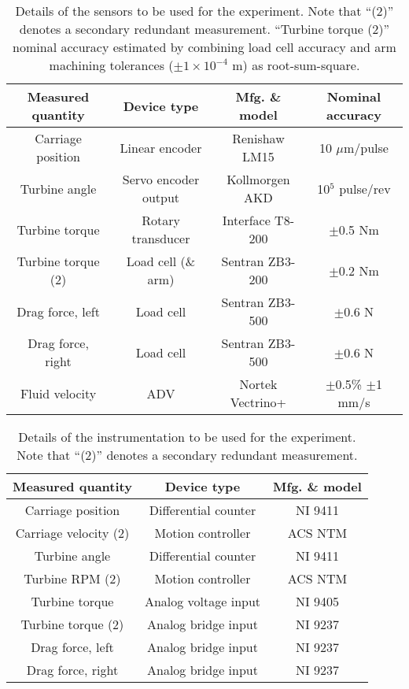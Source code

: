 \begin{table}[ht]
    \centering
    \begin{tabular}{c|c|c|c}
        Measured quantity & Device type & Mfg. \& model & Nominal accuracy \\
        \hline 
        Carriage position & Linear encoder & Renishaw LM15 & 10 $\mu$m/pulse \cite{RenishawLM15}\\
        Turbine angle & Servo encoder output & Kollmorgen AKD & 10$^5$ pulse/rev \cite{KollmorgenAKD}\\
        Turbine torque & Rotary transducer & Interface T8-200 & $\pm$0.5 Nm \cite{InterfaceT8}\\ 
        Turbine torque (2) & Load cell (\& arm) & Sentran ZB3-200 & $\pm$0.2 Nm \cite{SentranZB}\\
        Drag force, left & Load cell & Sentran ZB3-500 & $\pm$0.6 N \cite{SentranZB}\\
        Drag force, right & Load cell & Sentran ZB3-500 & $\pm$0.6 N \cite{SentranZB}\\
        Fluid velocity & ADV & Nortek Vectrino+ & $\pm$0.5\% $\pm$1 mm/s \cite{NortekVectrino}\\
    \end{tabular}
    \caption{Details of the sensors to be used for the experiment. Note that ``(2)''
        denotes a secondary redundant measurement. ``Turbine torque (2)'' nominal
        accuracy estimated by combining load cell accuracy and arm machining tolerances
        ($\pm 1 \times 10^{-4}$ m) as root-sum-square.} \label{tab:sensors}
\end{table}

\begin{table}[ht]
    \centering
    \begin{tabular}{c|c|c}
        Measured quantity & Device type & Mfg. \& model \\
        \hline 
        Carriage position & Differential counter & NI 9411 \\
        Carriage velocity (2) & Motion controller & ACS NTM \\
        Turbine angle & Differential counter & NI 9411 \\
        Turbine RPM (2) & Motion controller & ACS NTM \\
        Turbine torque & Analog voltage input & NI 9405 \\ 
        Turbine torque (2) & Analog bridge input & NI 9237 \\
        Drag force, left & Analog bridge input & NI 9237 \\
        Drag force, right & Analog bridge input & NI 9237 \\
    \end{tabular}
    \caption{Details of the instrumentation to be used for the experiment. Note that
        ``(2)'' denotes a secondary redundant measurement.}
    \label{tab:instrumentation}
\end{table}

